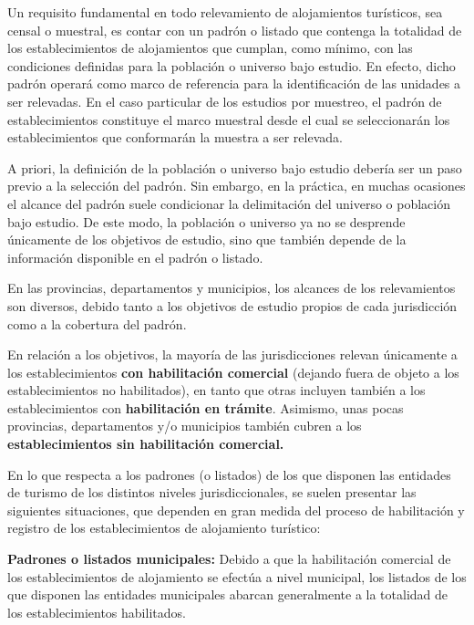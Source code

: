 \documentclass[
]{book}
\begin{document}
Un requisito fundamental en todo relevamiento de alojamientos turísticos, sea censal o muestral, es contar con un padrón o listado que contenga la totalidad de los establecimientos de alojamientos que cumplan, como mínimo, con las condiciones definidas para la población o universo bajo estudio. En efecto, dicho padrón operará como marco de referencia para la identificación de las unidades a ser relevadas. En el caso particular de los estudios por muestreo, el padrón de establecimientos constituye el marco muestral desde el cual se seleccionarán los establecimientos que conformarán la muestra a ser relevada.

A priori, la definición de la población o universo bajo estudio debería ser un paso previo a la selección del padrón. Sin embargo, en la práctica, en muchas ocasiones el alcance del padrón suele condicionar la delimitación del universo o población bajo estudio. De este modo, la población o universo ya no se desprende únicamente de los objetivos de estudio, sino que también depende de la información disponible en el padrón o listado.

En las provincias, departamentos y municipios, los alcances de los relevamientos son diversos, debido tanto a los objetivos de estudio propios de cada jurisdicción como a la cobertura del padrón.~

En relación a los objetivos, la mayoría de las jurisdicciones relevan únicamente a los establecimientos \textbf{con habilitación comercial} (dejando fuera de objeto a los establecimientos no habilitados), en tanto que otras incluyen también a los establecimientos con \textbf{habilitación en trámite}. Asimismo, unas pocas provincias, departamentos y/o municipios también cubren a los \textbf{establecimientos sin habilitación comercial.}

En lo que respecta a los padrones (o listados) de los que disponen las entidades de turismo de los distintos niveles jurisdiccionales, se suelen presentar las siguientes situaciones, que dependen en gran medida del proceso de habilitación y registro de los establecimientos de alojamiento turístico:

\textbf{Padrones o listados municipales:} Debido a que la habilitación comercial de los establecimientos de alojamiento se efectúa a nivel municipal, los listados de los que disponen las entidades municipales abarcan generalmente a la totalidad de los establecimientos habilitados.
\end{document}
